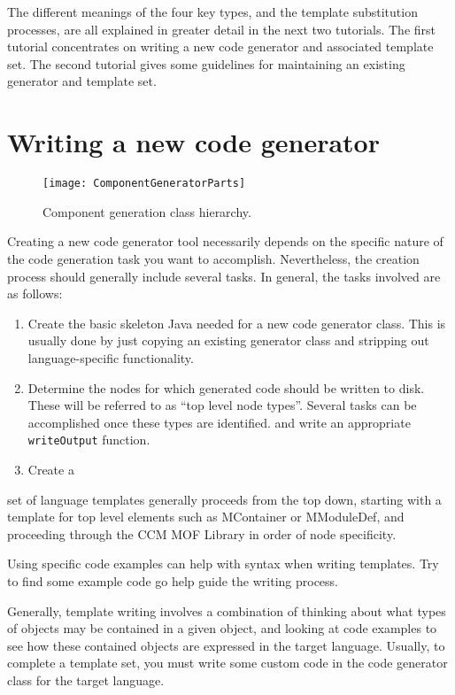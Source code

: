 The different meanings of the four key types, and the template substitution
processes, are all explained in greater detail in the next two tutorials. The
first tutorial concentrates on writing a new code generator and associated
template set. The second tutorial gives some guidelines for maintaining an
existing generator and template set.

\section{Writing a new code generator}

\begin{figure}
\centering
\texttt{[image: ComponentGeneratorParts]}
\caption{Component generation class hierarchy.}
\label{fig:component-generator-parts}
\end{figure}

Creating a new code generator tool necessarily depends on the specific nature of
the code generation task you want to accomplish. Nevertheless, the creation
process should generally include several tasks. In general, the tasks involved
are as follows:

\begin{enumerate}
\item Create the basic skeleton Java needed for a new code generator class. This
      is usually done by just copying an existing generator class and stripping
      out language-specific functionality.
\item Determine the nodes for which generated code should be written to disk.
      These will be referred to as ``top level node types''. Several tasks can
      be accomplished once these types are identified.
      and write an appropriate {\tt writeOutput} function.
\item Create a
\end{enumerate}
set of language templates generally proceeds from the top down,
starting with a template for top level elements such as MContainer or
MModuleDef, and proceeding through the CCM MOF Library in order of node
specificity.

Using specific code examples can help with syntax when writing templates. Try to
find some example code go help guide the writing process.

Generally, template writing involves a combination of thinking about what types
of objects may be contained in a given object, and looking at code examples to
see how these contained objects are expressed in the target language. Usually,
to complete a template set, you must write some custom code in the code
generator class for the target language.

